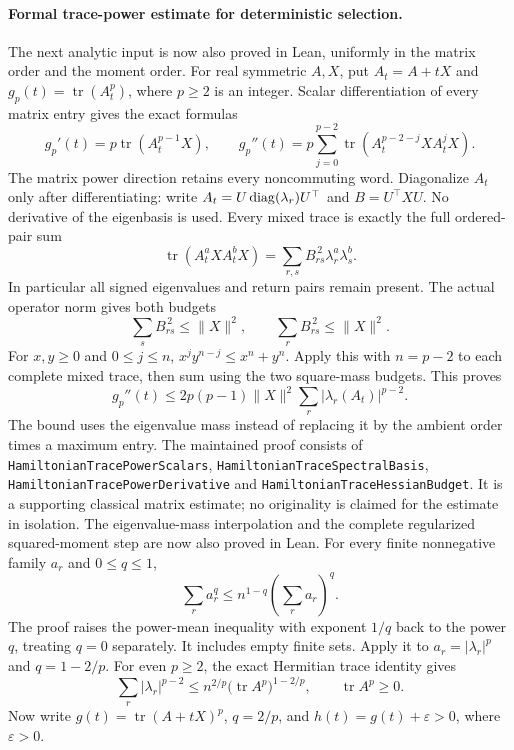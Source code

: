 \paragraph{Formal trace-power estimate for deterministic selection.}
The next analytic input is now also proved in Lean, uniformly in the
matrix order and the moment order.
For real symmetric \(A,X\), put \(A_t=A+tX\) and
\(g_p(t)=\operatorname{tr}(A_t^p)\), where \(p\geq2\) is an integer.
Scalar differentiation of every matrix entry gives the exact formulas
\[
 g_p'(t)=p\operatorname{tr}(A_t^{p-1}X),\qquad
 g_p''(t)=p\sum_{j=0}^{p-2}
          \operatorname{tr}(A_t^{p-2-j}XA_t^jX).
\]
The matrix power direction retains every noncommuting word.
Diagonalize \(A_t\) only after differentiating:
write \(A_t=U\operatorname{diag}(\lambda_r)U^\top\) and \(B=U^\top XU\).
No derivative of the eigenbasis is used.
Every mixed trace is exactly the full ordered-pair sum
\[
 \operatorname{tr}(A_t^aXA_t^bX)
   =\sum_{r,s}B_{rs}^{\,2}\lambda_r^a\lambda_s^b.
\]
In particular all signed eigenvalues and return pairs remain present.
The actual operator norm gives both budgets
\[
 \sum_s B_{rs}^{\,2}\leq\|X\|^2,\qquad
 \sum_r B_{rs}^{\,2}\leq\|X\|^2.
\]
For \(x,y\geq0\) and \(0\leq j\leq n\),
\(x^jy^{n-j}\leq x^n+y^n\).
Apply this with \(n=p-2\) to each complete mixed trace,
then sum using the two square-mass budgets.  This proves
\[
 \boxed{\quad
 g_p''(t)\leq
 2p(p-1)\|X\|^2\sum_r|\lambda_r(A_t)|^{p-2}.
 \quad}
\]
The bound uses the eigenvalue mass instead of replacing it by the
ambient order times a maximum entry.
The maintained proof consists of
\texttt{HamiltonianTracePowerScalars},
\texttt{HamiltonianTraceSpectralBasis},
\texttt{HamiltonianTracePowerDerivative} and
\texttt{HamiltonianTraceHessianBudget}.
It is a supporting classical matrix estimate; no originality is
claimed for the estimate in isolation.
The eigenvalue-mass interpolation and the complete regularized
squared-moment step are now also proved in Lean.
For every finite nonnegative family \(a_r\) and \(0\leq q\leq1\),
\[
 \sum_r a_r^q\leq n^{1-q}\left(\sum_r a_r\right)^q.
\]
The proof raises the power-mean inequality with exponent \(1/q\)
back to the power \(q\), treating \(q=0\) separately.
It includes empty finite sets.
Apply it to \(a_r=|\lambda_r|^p\) and \(q=1-2/p\).
For even \(p\geq2\), the exact Hermitian trace identity gives
\[
 \sum_r|\lambda_r|^{p-2}
 \leq n^{2/p}\bigl(\operatorname{tr}A^p\bigr)^{1-2/p},
 \qquad \operatorname{tr}A^p\geq0.
\]
Now write \(g(t)=\operatorname{tr}(A+tX)^p\),
\(q=2/p\), and \(h(t)=g(t)+\varepsilon>0\), where
\(\varepsilon>0\).
